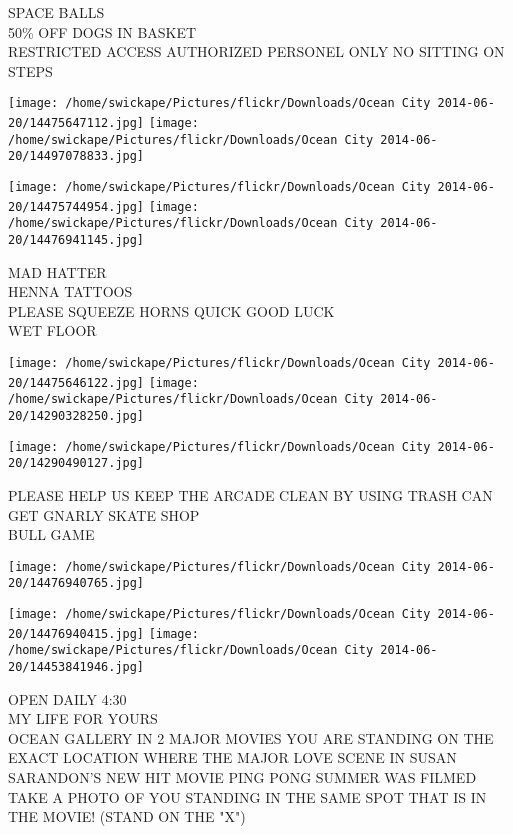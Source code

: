 \documentclass[10pt,letterpaper]{article}
\begin{document}
SPACE BALLS\\
50\% OFF DOGS IN BASKET\\
RESTRICTED ACCESS AUTHORIZED PERSONEL ONLY NO SITTING ON STEPS\\
\pagebreak

\texttt{[image: /home/swickape/Pictures/flickr/Downloads/Ocean City 2014-06-20/14475647112.jpg]}
\texttt{[image: /home/swickape/Pictures/flickr/Downloads/Ocean City 2014-06-20/14497078833.jpg]}

\texttt{[image: /home/swickape/Pictures/flickr/Downloads/Ocean City 2014-06-20/14475744954.jpg]}
\texttt{[image: /home/swickape/Pictures/flickr/Downloads/Ocean City 2014-06-20/14476941145.jpg]}

MAD HATTER\\
HENNA TATTOOS\\
PLEASE SQUEEZE HORNS QUICK GOOD LUCK\\
WET FLOOR\\
\pagebreak

\texttt{[image: /home/swickape/Pictures/flickr/Downloads/Ocean City 2014-06-20/14475646122.jpg]}
\texttt{[image: /home/swickape/Pictures/flickr/Downloads/Ocean City 2014-06-20/14290328250.jpg]}

\texttt{[image: /home/swickape/Pictures/flickr/Downloads/Ocean City 2014-06-20/14290490127.jpg]}

PLEASE HELP US KEEP THE ARCADE CLEAN BY USING TRASH CAN\\
GET GNARLY SKATE SHOP\\
BULL GAME\\
\pagebreak

\texttt{[image: /home/swickape/Pictures/flickr/Downloads/Ocean City 2014-06-20/14476940765.jpg]}

\vspace{0.25in}
\texttt{[image: /home/swickape/Pictures/flickr/Downloads/Ocean City 2014-06-20/14476940415.jpg]}
\texttt{[image: /home/swickape/Pictures/flickr/Downloads/Ocean City 2014-06-20/14453841946.jpg]}

OPEN DAILY 4:30\\
MY LIFE FOR YOURS\\
OCEAN GALLERY IN 2 MAJOR MOVIES YOU ARE STANDING ON THE EXACT LOCATION WHERE THE MAJOR LOVE SCENE IN SUSAN SARANDON'S NEW HIT MOVIE PING PONG SUMMER WAS FILMED TAKE A PHOTO OF YOU STANDING IN THE SAME SPOT THAT IS IN THE MOVIE!  (STAND ON THE "X")\\
\pagebreak
\end{document}
